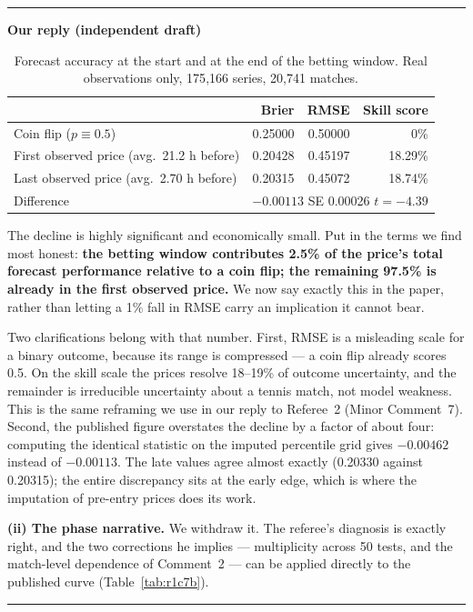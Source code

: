 \documentclass[letterpaper,12pt]{article}
\newcounter{b}
\newenvironment{ourreply}
  {\par\medskip\noindent\textcolor{ourcol}{\rule{\linewidth}{1pt}}%
   \par\nobreak\vspace{3pt}%
   \noindent\textbf{\textcolor{ourcol}{Our reply (independent draft)}}%
   \par\nobreak\vspace{3pt}}
  {\par\vspace{3pt}%
   \noindent\textcolor{ourcol}{\rule{\linewidth}{0.4pt}}\par\medskip}
\begin{document}
\begin{enumerate}
\begin{ourreply}
\begin{table}[h]
\centering
\caption{Forecast accuracy at the start and at the end of the betting window.
Real observations only, 175{,}166 series, 20{,}741 matches.}
\label{tab:r1c7a}
\small
\begin{tabular}{lrrr}
\toprule
 & Brier & RMSE & Skill score \\
\midrule
Coin flip ($p \equiv 0.5$)                     & 0.25000 & 0.50000 & 0\% \\
First observed price (avg.\ 21.2 h before)     & 0.20428 & 0.45197 & 18.29\% \\
Last observed price (avg.\ 2.70 h before)      & 0.20315 & 0.45072 & 18.74\% \\
\midrule
Difference                                     & \multicolumn{3}{l}{$-0.00113$ \quad SE 0.00026 \quad $t=-4.39$} \\
\bottomrule
\end{tabular}
\end{table}

The decline is highly significant and economically small. Put in the terms we
find most honest: \textbf{the betting window contributes 2.5\% of the price's
total forecast performance relative to a coin flip; the remaining 97.5\% is
already in the first observed price.} We now say exactly this in the paper,
rather than letting a 1\% fall in RMSE carry an implication it cannot bear.

Two clarifications belong with that number. First, RMSE is a misleading scale
for a binary outcome, because its range is compressed --- a coin flip already
scores 0.5. On the skill scale the prices resolve 18--19\% of outcome
uncertainty, and the remainder is irreducible uncertainty about a tennis
match, not model weakness. This is the same reframing we use in our reply to
Referee~2 (Minor Comment~7). Second, the published figure overstates the
decline by a factor of about four: computing the identical statistic on the
imputed percentile grid gives $-0.00462$ instead of $-0.00113$. The late
values agree almost exactly (0.20330 against 0.20315); the entire discrepancy
sits at the early edge, which is where the imputation of pre-entry prices
does its work.

\textbf{(ii) The phase narrative.} We withdraw it. The referee's diagnosis is
exactly right, and the two corrections he implies --- multiplicity across 50
tests, and the match-level dependence of Comment~2 --- can be applied
directly to the published curve (Table~\ref{tab:r1c7b}).


\end{ourreply}
\end{enumerate}
\end{document}
